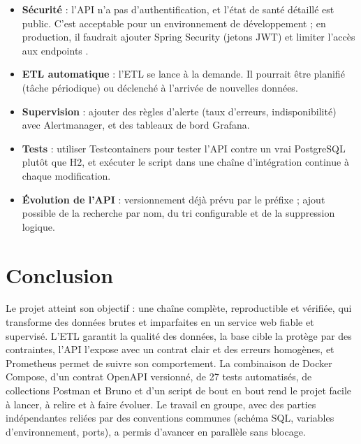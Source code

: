 \documentclass[11pt,a4paper]{article}
\newcommand{\code}[1]{\texttt{\detokenize{#1}}}
\begin{document}
\begin{itemize}
  \item \textbf{Sécurité} : l'API n'a pas d'authentification, et l'état de santé détaillé est public. C'est
        acceptable pour un environnement de développement ; en production, il faudrait ajouter Spring
        Security (jetons JWT) et limiter l'accès aux endpoints \code{/actuator}.
  \item \textbf{ETL automatique} : l'ETL se lance à la demande. Il pourrait être planifié (tâche
        périodique) ou déclenché à l'arrivée de nouvelles données.
  \item \textbf{Supervision} : ajouter des règles d'alerte (taux d'erreurs, indisponibilité) avec
        Alertmanager, et des tableaux de bord Grafana.
  \item \textbf{Tests} : utiliser Testcontainers pour tester l'API contre un vrai PostgreSQL plutôt que H2,
        et exécuter le script \code{tests/e2e.sh} dans une chaîne d'intégration continue à chaque modification.
  \item \textbf{Évolution de l'API} : versionnement déjà prévu par le préfixe \code{/api/v1} ; ajout possible
        de la recherche par nom, du tri configurable et de la suppression logique.
\end{itemize}

\section{Conclusion}

Le projet atteint son objectif : une chaîne complète, reproductible et vérifiée, qui transforme des données
brutes et imparfaites en un service web fiable et supervisé. L'ETL garantit la qualité des données, la base
cible la protège par des contraintes, l'API l'expose avec un contrat clair et des erreurs homogènes, et
Prometheus permet de suivre son comportement. La combinaison de Docker Compose, d'un contrat OpenAPI
versionné, de 27 tests automatisés, de collections Postman et Bruno et d'un script de bout en bout rend le projet facile à lancer, à relire et à
faire évoluer. Le travail en groupe, avec des parties indépendantes reliées par des conventions communes
(schéma SQL, variables d'environnement, ports), a permis d'avancer en parallèle sans blocage.

\appendix
\end{document}
